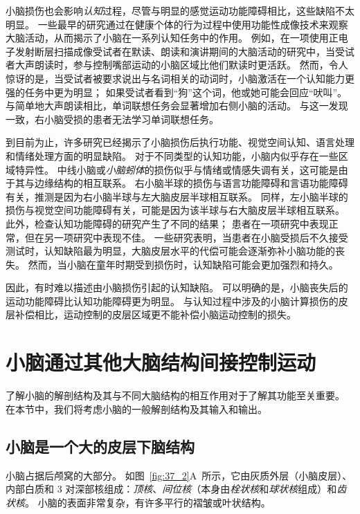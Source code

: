 小脑损伤也会影响\textit{认知}过程，尽管与明显的感觉运动功能障碍相比，这些缺陷不太明显。
一些最早的研究通过在健康个体的行为过程中使用功能性成像技术来观察大脑活动，从而揭示了小脑在一系列认知任务中的作用。
例如，在一项使用正电子发射断层扫描成像受试者在默读、朗读和演讲期间的大脑活动的研究中，当受试者大声朗读时，参与控制嘴部运动的小脑区域比他们默读时更活跃。
然而，令人惊讶的是，当受试者被要求说出与名词相关的动词时，小脑激活在一个认知能力更强的任务中更为明显；
如果受试者看到“狗”这个词，他或她可能会回应“吠叫”。
与简单地大声朗读相比，单词联想任务会显著增加右侧小脑的活动。
与这一发现一致，右小脑受损的患者无法学习单词联想任务。


到目前为止，许多研究已经揭示了小脑损伤后执行功能、视觉空间认知、语言处理和情绪处理方面的明显缺陷。
对于不同类型的认知功能，小脑内似乎存在一些区域特异性。
中线小脑或\textit{小脑蚓体}的损伤似乎与情绪或情感失调有关，这可能是由于其与边缘结构的相互联系。
右小脑半球的损伤与语言功能障碍和言语功能障碍有关，推测是因为右小脑半球与左大脑皮层半球相互联系。
同样，左小脑半球的损伤与视觉空间功能障碍有关，可能是因为该半球与右大脑皮层半球相互联系。
此外，检查认知功能障碍的研究产生了不同的结果；
患者在一项研究中表现正常，但在另一项研究中表现不佳。
一些研究表明，当患者在小脑受损后不久接受测试时，认知缺陷最为明显，大脑皮层水平的代偿可能会逐渐弥补小脑功能的丧失。
然而，当小脑在童年时期受到损伤时，认知缺陷可能会更加强烈和持久。


因此，有时难以描述由小脑损伤引起的认知缺陷。
可以明确的是，小脑丧失后的运动功能障碍比认知功能障碍更为明显。
与认知过程中涉及的小脑计算损伤的皮层补偿相比，运动控制的皮层区域更不能补偿小脑运动控制的损失。



\section{小脑通过其他大脑结构间接控制运动}

了解小脑的解剖结构及其与不同大脑结构的相互作用对于了解其功能至关重要。
在本节中，我们将考虑小脑的一般解剖结构及其输入和输出。


\subsection{小脑是一个大的皮层下脑结构}

小脑占据后颅窝的大部分。
如图~\ref{fig:37_2}A~所示，它由灰质外层（小脑皮层）、内部白质和 3 对深部核组成：\textit{顶核}、\textit{间位核}（本身由\textit{栓状核}和\textit{球状核}组成）和\textit{齿状核}。
小脑的表面非常复杂，有许多平行的褶皱或叶状结构。


